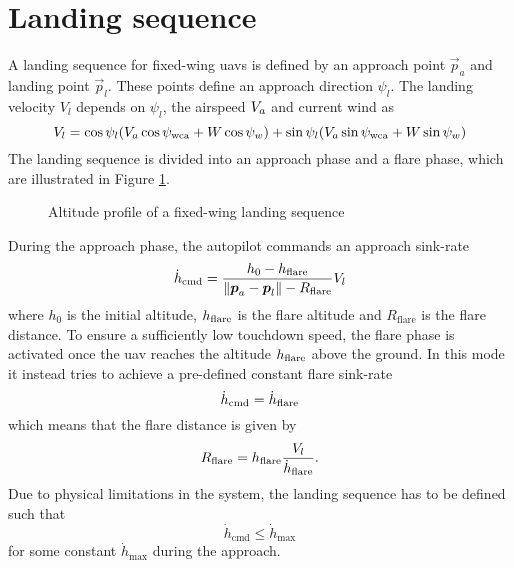 \section{Landing sequence}
A landing sequence for fixed-wing \acp{uav} is defined by an approach point $\vec{p}_a$ and landing point $\vec{p}_l$. These points 
define an approach direction $\psi_l$. The landing velocity $V_l$ depends on $\psi_l$, the airspeed $V_a$ and current wind as 
\begin{equation}
    V_l=\cos\psi_l(V_a\cos\psi_{\text{wca}}+W\cos\psi_w) + \sin\psi_l(V_a\sin\psi_{\text{wca}}+W\sin\psi_w)
\end{equation}
The landing sequence is divided into an approach phase and a flare phase, which are illustrated in Figure \ref{fig:land_alt}.
\begin{figure}[H]
    \begin{center}
    \end{center}
    \caption{Altitude profile of a fixed-wing landing sequence}
    \label{fig:land_alt}
\end{figure}
\noindent During the approach phase, the autopilot commands an approach sink-rate
\begin{equation}\label{eq:sink_rate}
    \dot{h}_{\text{cmd}}=\frac{h_0-h_{\text{flare}}}{\|\boldsymbol{p}_a-\boldsymbol{p}_l\|-R_{\text{flare}}}V_l
\end{equation}
where $h_0$ is the initial altitude, $h_{\text{flare}}$ is the flare altitude and $R_{\text{flare}}$ is the flare distance.
To ensure a sufficiently low touchdown speed, the flare phase is activated once the \ac{uav} reaches the altitude $h_{\text{flare}}$ above the ground. 
In this mode it instead tries to achieve a pre-defined constant flare sink-rate 
\begin{equation}
    \dot{h}_{\text{cmd}}=\dot{h}_{\text{flare}}
\end{equation}
which means that the flare distance is given by
\begin{equation}\label{eq:R_flare}
    R_{\text{flare}}=h_{\text{flare}}\frac{V_l}{\dot{h}_{\text{flare}}}.
\end{equation}
Due to physical limitations in the system, the landing sequence has to be defined such that 
\begin{equation}\label{eq:sink_constraint}
    \dot{h}_{\text{cmd}}\leq\dot{h}_{\text{max}}
\end{equation}
for some constant $\dot{h}_{\text{max}}$ during the approach.

